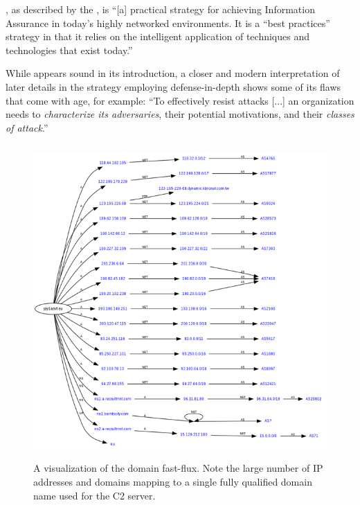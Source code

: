 \documentclass[11.5pt,letterpaper,titlepage]{report}
\begin{document}
\didlong \autocite{nsa}, as described by the \nsa, is
“[a] practical strategy for achieving Information Assurance in today's highly
networked environments.  It is a ``best practices'' strategy in that it relies on
the intelligent application of techniques and technologies that exist today.”

While \did appears sound in its introduction, a closer and modern
interpretation of later details in the \nsa strategy employing defense-in-depth
shows some of its flaws that come with age, for example: ``To effectively resist
attacks [...] an organization needs to \emph{characterize its adversaries}, their
potential motivations, and their \emph{classes of attack}.''

\begin{figure}[h!]
	\centering
  \includegraphics[height=12cm]{./fastflux.png}
  \caption{A visualization of the domain fast-flux. Note the large
  number of IP addresses and domains mapping to a single fully qualified
  domain name used for the C2 server.}
\end{figure}
\end{document}
